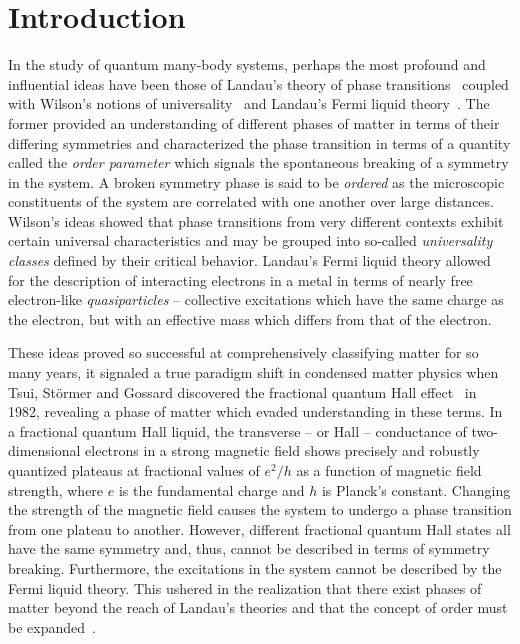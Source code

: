 \chapter{Introduction}
\label{chapter:Introduction}
%
%
In the study of quantum many-body systems, perhaps the most profound and influential ideas have been those of Landau's theory of phase transitions~\cite{LandauNature1936,LandauZETF1937,GinzburgZETF1950} coupled with Wilson's notions of universality~\cite{WilsonPRB1971I,WilsonPRB1971II,WilsonPRL1972,WilsonRMP1975} and Landau's Fermi liquid theory~\cite{LandauZETF1956,LandauZETF1957,LandauZETF1958}.
The former provided an understanding of different phases of matter in terms of their differing symmetries and characterized the phase transition in terms of a quantity called the \textit{order parameter} which signals the spontaneous breaking of a symmetry in the system.
A broken symmetry phase is said to be \textit{ordered} as the microscopic constituents of the system are correlated with one another over large distances.
Wilson's ideas showed that phase transitions from very different contexts exhibit certain universal characteristics and may be grouped into so-called \textit{universality classes} defined by their critical behavior.
Landau's Fermi liquid theory allowed for the description of interacting electrons in a metal in terms of nearly free electron-like \textit{quasiparticles} -- collective excitations which have the same charge as the electron, but with an effective mass which differs from that of the electron.

These ideas proved so successful at comprehensively classifying matter for so many years, it signaled a true paradigm shift in condensed matter physics when Tsui, St\"ormer and Gossard discovered the fractional quantum Hall effect~\cite{TsuiPRL1982} in 1982, revealing a phase of matter which evaded understanding in these terms.
In a fractional quantum Hall liquid, the transverse -- or Hall -- conductance of two-dimensional electrons in a strong magnetic field shows precisely and robustly quantized plateaus at fractional values of $e^2/h$ as a function of magnetic field strength, where $e$ is the fundamental charge and $h$ is Planck's constant.
Changing the strength of the magnetic field causes the system to undergo a phase transition from one plateau to another.
However, different fractional quantum Hall states all have the same symmetry and, thus, cannot be described in terms of symmetry breaking.
Furthermore, the excitations in the system cannot be described by the Fermi liquid theory.
This ushered in the realization that there exist phases of matter beyond the reach of Landau's theories and that the concept of order must be expanded~\cite{WenJMPB1990,WenAiP1995,WenPRB2002,WenPLA2002}.


